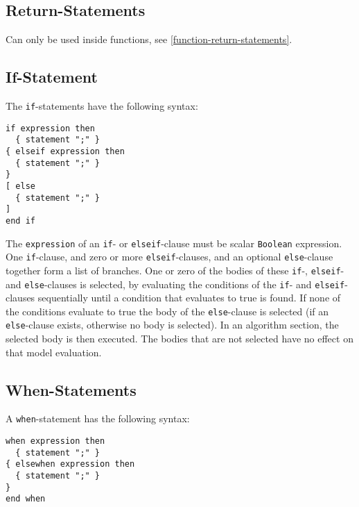 \subsection{Return-Statements}\label{return-statements}

Can only be used inside functions, see \cref{function-return-statements}.

\subsection{If-Statement}\label{if-statement}

The \lstinline!if!-statements have the following syntax:
\begin{lstlisting}[language=grammar]
if expression then
  { statement ";" }
{ elseif expression then
  { statement ";" }
}
[ else
  { statement ";" }
]
end if
\end{lstlisting}

The \lstinline!expression! of an \lstinline!if!- or \lstinline!elseif!-clause must be scalar \lstinline!Boolean! expression.
One \lstinline!if!-clause, and zero or more \lstinline!elseif!-clauses, and an optional \lstinline!else!-clause together form a list of branches.
One or zero of the bodies of these \lstinline!if!-, \lstinline!elseif!- and \lstinline!else!-clauses is selected, by evaluating the conditions of the \lstinline!if!- and \lstinline!elseif!-clauses sequentially until a condition that evaluates to true is found.
If none of the conditions evaluate to true the body of the \lstinline!else!-clause is selected (if an \lstinline!else!-clause exists, otherwise no body is selected).
In an algorithm section, the selected body is then executed.
The bodies that are not selected have no effect on that model evaluation.

\subsection{When-Statements}\label{when-statements}

A \lstinline!when!-statement has the following syntax:
\begin{lstlisting}[language=grammar]
when expression then
  { statement ";" }
{ elsewhen expression then
  { statement ";" }
}
end when
\end{lstlisting}

